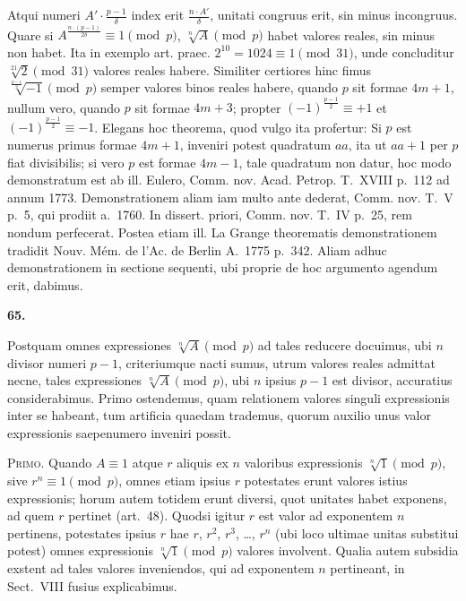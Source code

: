 \documentclass[12pt,a4paper]{article}
\theoremstyle{plain}
\theoremstyle{definition}
\theoremstyle{remark}
\begin{document}
Atqui numeri $A' \cdot \frac{p-1}{\delta}$ index erit $\frac{n \cdot A'}{\delta}$, unitati congruus erit, sin minus incongruus. Quare si $A^{\frac{n \cdot (p-1)}{2\delta}} \equiv 1 \pmod{p}$, $\sqrt[n]{A} \pmod{p}$ habet valores reales, sin minus non habet. Ita in exemplo art. praec. $2^{10} = 1024 \equiv 1 \pmod{31}$, unde concluditur $\sqrt[21]{2} \pmod{31}$ valores reales habere. Similiter certiores hinc fimus $\sqrt[\frac{p-1}{2}]{-1} \pmod{p}$ semper valores binos reales habere, quando $p$ sit formae $4m+1$, nullum vero, quando $p$ sit formae $4m+3$; propter $(-1)^{\frac{p-1}{2}} \equiv +1$ et $(-1)^{\frac{p-1}{2}} \equiv -1$. Elegans hoc theorema, quod vulgo ita profertur: Si $p$ est numerus primus formae $4m+1$, inveniri potest quadratum $aa$, ita ut $aa+1$ per $p$ fiat divisibilis; si vero $p$ est formae $4m-1$, tale quadratum non datur, hoc modo demonstratum est ab ill. Eulero, Comm. nov. Acad. Petrop. T.~XVIII p.~112 ad annum 1773. Demonstrationem aliam iam multo ante dederat, Comm. nov. T.~V p.~5, qui prodiit a.~1760. In dissert. priori, Comm. nov. T.~IV p.~25, rem nondum perfecerat. Postea etiam ill. La Grange theorematis demonstrationem tradidit Nouv. Mém. de l'Ac. de Berlin A.~1775 p.~342. Aliam adhuc demonstrationem in sectione sequenti, ubi proprie de hoc argumento agendum erit, dabimus.

\setcounter{satz}{65}
\addtocounter{satz}{-1}
\textbf{65.}

Postquam omnes expressiones $\sqrt[n]{A} \pmod{p}$ ad tales reducere docuimus, ubi $n$ divisor numeri $p-1$, criteriumque nacti sumus, utrum valores reales admittat necne, tales expressiones $\sqrt[n]{A} \pmod{p}$, ubi $n$ ipsius $p-1$ est divisor, accuratius considerabimus. Primo ostendemus, quam relationem valores singuli expressionis inter se habeant, tum artificia quaedam trademus, quorum auxilio unus valor expressionis saepenumero inveniri possit.

\textsc{Primo.} Quando $A \equiv 1$ atque $r$ aliquis ex $n$ valoribus expressionis $\sqrt[n]{1} \pmod{p}$, sive $r^n \equiv 1 \pmod{p}$, omnes etiam ipsius $r$ potestates erunt valores istius expressionis; horum autem totidem erunt diversi, quot unitates habet exponens, ad quem $r$ pertinet (art.~48). Quodsi igitur $r$ est valor ad exponentem $n$ pertinens, potestates ipsius $r$ hae $r$, $r^2$, $r^3$, \ldots, $r^n$ (ubi loco ultimae unitas substitui potest) omnes expressionis $\sqrt[n]{1} \pmod{p}$ valores involvent. Qualia autem subsidia exstent ad tales valores inveniendos, qui ad exponentem $n$ pertineant, in Sect.~VIII fusius explicabimus.
\end{document}
